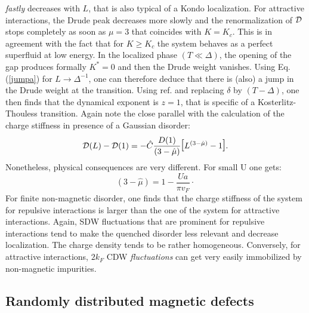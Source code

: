{\it fastly} decreases with $L$, that is also typical of a
Kondo localization.
For attractive interactions, the Drude
peak decreases more slowly and the renormalization of ${\cal D}$ stops
completely as soon as $\mu=3$ that coincides
with $K=K_c$. This is in agreement
with the fact that for $K\geq K_c$
 the system behaves as a perfect superfluid 
at low energy.
\vskip 0.2cm
In the localized phase $(T\ll\Delta)$, the opening of the gap produces
formally $K^*=0$ and then the Drude weight
vanishes. Using Eq.(\ref{jumpa}) for $L\rightarrow{\Delta}^{-1}$, 
one can therefore deduce that there is (also) a jump
in the Drude weight at the transition. Using
ref.\cite{remark1} and replacing $\delta$
by $(T-\Delta)$, one then finds that the dynamical exponent is $z=1$,
that is specific of a Kosterlitz-Thouless transition.
\vskip 0.2cm
Again note the close parallel with the calculation of the charge stiffness
in presence of a Gaussian disorder\cite{Giam-Shastry}:
\begin{equation}
{\cal D}(L)-{\cal D}(1)=-\hat{C}\frac{D(1)}{(3-\hat{\mu})}\hbox{\Large[}
L^{(3-\hat{\mu})}-1\hbox{\Large]}.
\end{equation}
Nonetheless, physical consequences are very different. For small U one gets:
\begin{equation}
(3-\hat{\mu})=1-\frac{Ua}{\pi v_F}\cdot
\end{equation}
For finite non-magnetic disorder, one
finds that the charge stiffness of the system for
repulsive interactions is larger than the one of the system for attractive
interactions. Again, SDW fluctuations that are prominent for repulsive
interactions tend to make the quenched
disorder less relevant and decrease localization. The charge density tends to
be rather homogeneous.
Conversely,
for attractive interactions, $2k_F$ 
CDW {\it fluctuations} can get very easily immobilized
by non-magnetic impurities.

\subsection{Randomly distributed magnetic defects}

